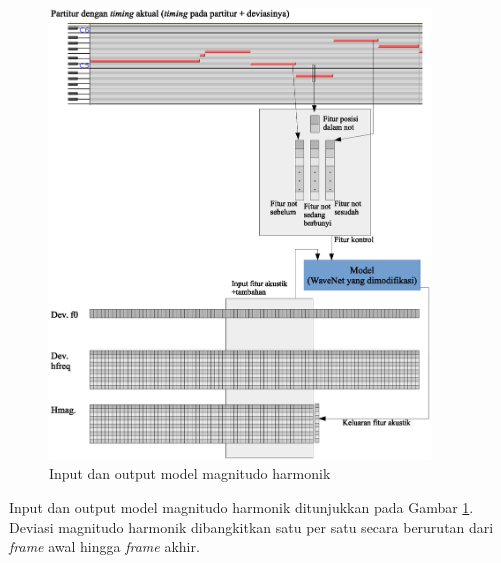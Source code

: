 \begin{figure}[htbp]
    \centering
    \includegraphics[width=0.9\textwidth]{resources/hmag-model-in-out.eps}
    \caption{Input dan output model magnitudo harmonik}\label{fig-hmag-model-in-out}
\end{figure}

Input dan output model magnitudo harmonik ditunjukkan pada Gambar \ref{fig-hmag-model-in-out}. Deviasi magnitudo harmonik dibangkitkan satu per satu secara berurutan dari \textit{frame} awal hingga \textit{frame} akhir.

